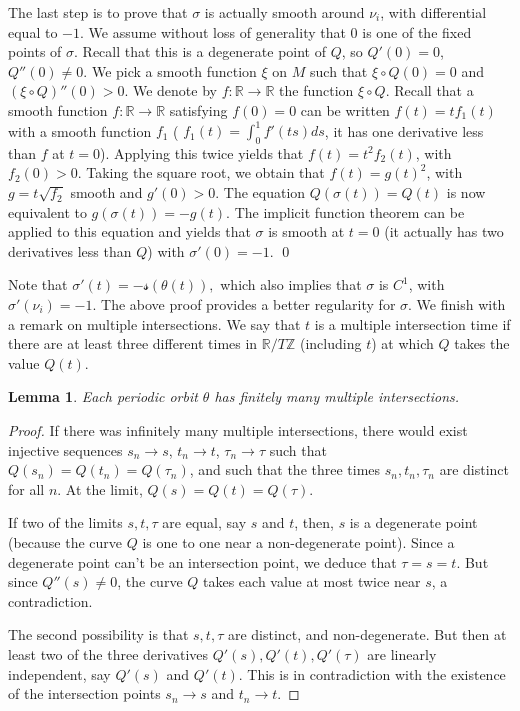 \documentclass[JEP,XML,SOM,Unicode,published]{cedram}
\newcommand{\Rm}{\mathbb{R}}
\newcommand{\Zm}{\ensuremath{\mathbb{Z}}}
\newcommand{\ms}{\ensuremath{\mathscr{s}}}
\theoremstyle{plain}
\newtheorem{lem}{Lemma}
\theoremstyle{definition}
\begin{document}
The last step is to prove that $\sigma$ is actually smooth around $\nu_i$, with differential equal to $-1$. We assume without loss of generality that $0$ is one of the fixed points of $\sigma$. Recall that this is a degenerate point of $Q$, so $Q'(0)=0$, $Q''(0)\neq 0$. We pick a smooth function $\xi$ on $M$ such that $\xi\circ Q(0)=0$ and $(\xi\circ Q)''(0)>0$. We denote by $f:\Rm\to \Rm $ the function $\xi\circ Q$.
Recall that a smooth function $f:\Rm\to \Rm$ satisfying $f(0)=0$ can be written $f(t)=tf_1(t)$ with a smooth function $f_1$ (
$f_1(t)=\int_0^1 f'(ts)ds$, it has one derivative less than $f$ at $t=0$). Applying this twice yields that $f(t)=t^2 f_2(t)$, with $f_2(0)> 0$. Taking the square root, we obtain that $f(t)=g(t)^2$, with $g=t\sqrt{f_2}$ smooth and $g'(0)>0$.
The equation $Q(\sigma(t))=Q(t)$ is now equivalent to $g (\sigma(t))=-g(t)$. The implicit function theorem can be applied to this equation and yields that $\sigma$ is smooth at $t=0$ (it actually has two derivatives less than $Q$) with $\sigma'(0)=-1$.
\qed

\medskip
Note that
$
\sigma'(t)=-\ms(\theta(t)),
$
which also implies that $\sigma$ is $C^1$, with $\sigma'(\nu_i)=-1$. The above proof provides a better regularity for $\sigma$.
We finish with a remark on multiple intersections. We say that $t$ is a multiple intersection time if there are at least three different times in $\Rm/T\Zm$ (including $t$) at which $Q$ takes the value $Q(t)$.

\begin{lem}\label{lem-multi}
Each periodic orbit $\theta$ has finitely many multiple intersections.
\end{lem}

\begin{proof}
If there was infinitely many multiple intersections, there would exist injective sequences $s_n\to s$, $t_n\to t$, $\tau_n \to \tau$
such that $Q(s_n)=Q(t_n)=Q(\tau_n)$, and such that the three times $s_n,t_n,\tau_n$ are distinct for all $n$.
At the limit, $Q(s)=Q(t)=Q(\tau)$.

If two of the limits $s,t,\tau$ are equal, say $s$ and $t$, then, $s$ is a degenerate point (because the curve $Q$ is one to one
near a non-degenerate point). Since a degenerate point can't be an intersection point, we deduce that $\tau=s=t$.
But since $Q''(s)\neq 0$, the curve $Q$ takes each value at most twice near $s$, a contradiction.

The second possibility is that $s, t, \tau$ are distinct, and non-degenerate. But then at least two of the three derivatives
$Q'(s), Q'(t), Q'(\tau)$ are linearly independent, say $Q'(s)$ and $Q'(t)$. This is in contradiction with the existence of the intersection points $s_n\to s$ and $t_n\to t$.
\end{proof}
\end{document}
